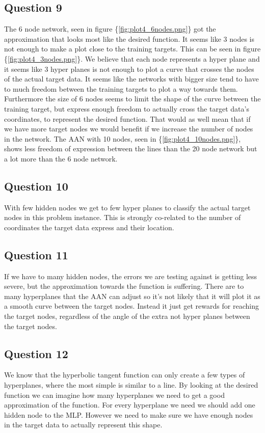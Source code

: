 \documentclass[a4paper]{article}
\begin{document}
\subsection*{Question 9}
The 6 node network, seen in figure \{\ref{fig:plot4_6nodes.png}\} got the approximation that looks most like the desired function. It seems like 3 nodes is not enough to make a plot close to the training targets. This can be seen in figure \{\ref{fig:plot4_3nodes.png}\}. We believe that each node represents a hyper plane and it seems like 3 hyper planes is not enough to plot a curve that crosses the nodes of the actual target data. It seems like the networks with bigger size tend to have to much freedom between the training targets to plot a way towards them. Furthermore the size of 6 nodes seems to limit the shape of the curve between the training target, but express enough freedom to actually cross the target data's coordinates, to represent the desired function. That would as well mean that if we have more target nodes we would benefit if we increase the number of nodes in the network. 
The AAN with 10 nodes, seen in \{\ref{fig:plot4_10nodes.png}\}, shows less freedom of expression between the lines than the 20 node network but a lot more than the 6 node network.

\subsection*{Question 10}
With few hidden nodes we get to few hyper planes to classify the actual target nodes in this problem instance. This is strongly co-related to the number of coordinates the target data express and their location. 

\subsection*{Question 11}
If we have to many hidden nodes, the errors we are testing against is getting less severe, but the approximation towards the function is suffering. There are to many hyperplanes that the AAN can adjust so it's not likely that it will plot it as a smooth curve between the target nodes. Instead it just get rewards for reaching the target nodes, regardless of the angle of the extra  not hyper planes between the target nodes.

\subsection*{Question 12}
We know that the hyperbolic tangent function can only create a few types of hyperplanes, where the most simple is similar to a line. By looking at the desired function we can imagine how many hyperplanes we need to get a good approximation of the function. For every hyperplane we need we should add one hidden node to the MLP. However we need to make sure we have enough nodes in the target data to actually represent this shape.
\end{document}

